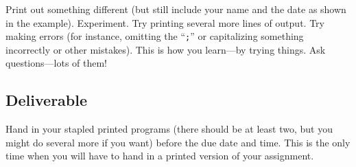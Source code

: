        Print out something different (but still include your name and the date
         as shown in the example). Experiment. Try printing several more lines of output.
       Try making errors (for instance, omitting the ``{\tt ;}'' or capitalizing
         something incorrectly or other mistakes). This is how you learn---by trying
       things. Ask questions---lots of them! 

       \subsection*{Deliverable}
       Hand in your stapled printed programs (there should be
         at least two, but you might do several more if you want) before the due date
       and time. 
       This is the only time when you will have to hand in a printed version of your assignment.

       
